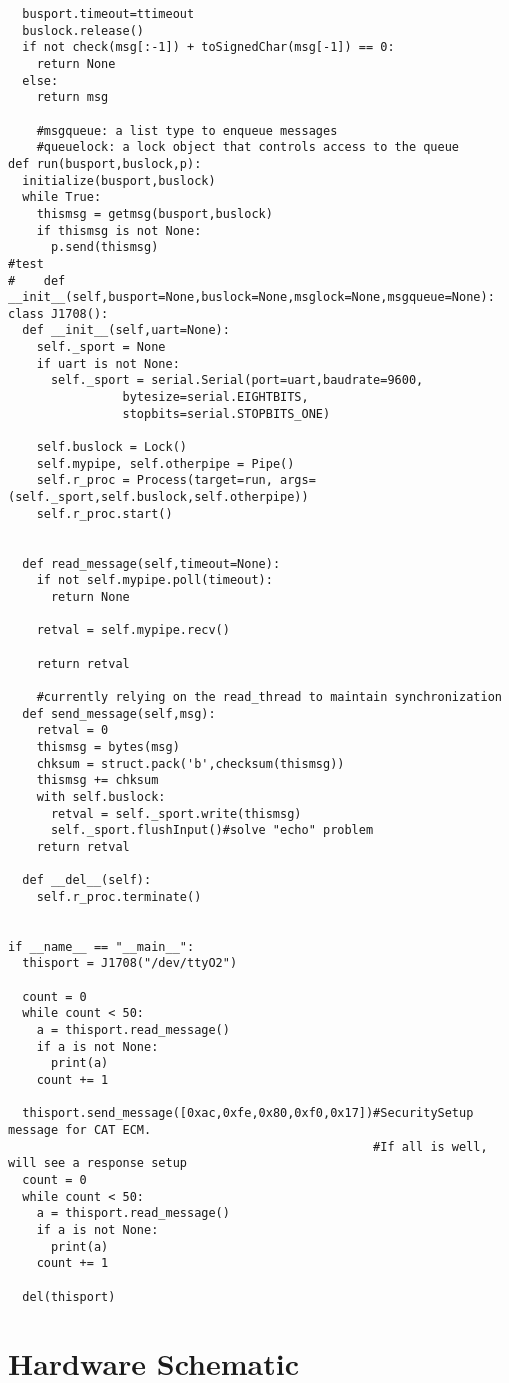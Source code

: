 \begin{appendices}
\begin{verbatim}
  busport.timeout=ttimeout
  buslock.release()
  if not check(msg[:-1]) + toSignedChar(msg[-1]) == 0:
    return None
  else:
    return msg

    #msgqueue: a list type to enqueue messages
    #queuelock: a lock object that controls access to the queue
def run(busport,buslock,p):
  initialize(busport,buslock)
  while True:
    thismsg = getmsg(busport,buslock)
    if thismsg is not None:
      p.send(thismsg)
#test
#    def __init__(self,busport=None,buslock=None,msglock=None,msgqueue=None):
class J1708():
  def __init__(self,uart=None):
    self._sport = None
    if uart is not None:
      self._sport = serial.Serial(port=uart,baudrate=9600,
                bytesize=serial.EIGHTBITS,
                stopbits=serial.STOPBITS_ONE)

    self.buslock = Lock()
    self.mypipe, self.otherpipe = Pipe()
    self.r_proc = Process(target=run, args=(self._sport,self.buslock,self.otherpipe))
    self.r_proc.start()


  def read_message(self,timeout=None):
    if not self.mypipe.poll(timeout):
      return None

    retval = self.mypipe.recv()

    return retval

    #currently relying on the read_thread to maintain synchronization
  def send_message(self,msg):
    retval = 0
    thismsg = bytes(msg)
    chksum = struct.pack('b',checksum(thismsg))
    thismsg += chksum
    with self.buslock:
      retval = self._sport.write(thismsg)
      self._sport.flushInput()#solve "echo" problem
    return retval
     
  def __del__(self):
    self.r_proc.terminate()


if __name__ == "__main__":
  thisport = J1708("/dev/ttyO2")
  
  count = 0
  while count < 50:
    a = thisport.read_message()
    if a is not None:
      print(a)
    count += 1

  thisport.send_message([0xac,0xfe,0x80,0xf0,0x17])#SecuritySetup message for CAT ECM.
                                                   #If all is well, will see a response setup
  count = 0
  while count < 50:
    a = thisport.read_message()
    if a is not None:
      print(a)
    count += 1

  del(thisport)
\end{verbatim}

\chapter{Hardware Schematic}\label{app:schematic}



\end{appendices}
